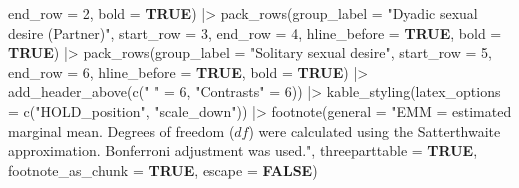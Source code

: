 \documentclass[
  bookmarksnumbered]{article}
\newenvironment{Shaded}{\begin{snugshade}}{\end{snugshade}}
\newcommand{\AttributeTok}[1]{\textcolor[rgb]{0.80,0.80,0.80}{#1}}
\newcommand{\ConstantTok}[1]{\textcolor[rgb]{0.86,0.64,0.64}{\textbf{#1}}}
\newcommand{\DecValTok}[1]{\textcolor[rgb]{0.86,0.86,0.80}{#1}}
\newcommand{\FunctionTok}[1]{\textcolor[rgb]{0.94,0.94,0.56}{#1}}
\newcommand{\NormalTok}[1]{\textcolor[rgb]{0.80,0.80,0.80}{#1}}
\newcommand{\OtherTok}[1]{\textcolor[rgb]{0.94,0.94,0.56}{#1}}
\newcommand{\SpecialCharTok}[1]{\textcolor[rgb]{0.86,0.64,0.64}{#1}}
\newcommand{\StringTok}[1]{\textcolor[rgb]{0.80,0.58,0.58}{#1}}
\begin{document}
\begin{Shaded}
\begin{Highlighting}[]
            \AttributeTok{end\_row =} \DecValTok{2}\NormalTok{,}
            \AttributeTok{bold =} \ConstantTok{TRUE}\NormalTok{) }\SpecialCharTok{|\textgreater{}}
  \FunctionTok{pack\_rows}\NormalTok{(}\AttributeTok{group\_label =} \StringTok{"Dyadic sexual desire (Partner)"}\NormalTok{,}
            \AttributeTok{start\_row =} \DecValTok{3}\NormalTok{,}
            \AttributeTok{end\_row =} \DecValTok{4}\NormalTok{,}
            \AttributeTok{hline\_before =} \ConstantTok{TRUE}\NormalTok{,}
            \AttributeTok{bold =} \ConstantTok{TRUE}\NormalTok{) }\SpecialCharTok{|\textgreater{}}
  \FunctionTok{pack\_rows}\NormalTok{(}\AttributeTok{group\_label =} \StringTok{"Solitary sexual desire"}\NormalTok{,}
            \AttributeTok{start\_row =} \DecValTok{5}\NormalTok{,}
            \AttributeTok{end\_row =} \DecValTok{6}\NormalTok{,}
            \AttributeTok{hline\_before =} \ConstantTok{TRUE}\NormalTok{,}
            \AttributeTok{bold =} \ConstantTok{TRUE}\NormalTok{) }\SpecialCharTok{|\textgreater{}}
  \FunctionTok{add\_header\_above}\NormalTok{(}\FunctionTok{c}\NormalTok{(}\StringTok{" "} \OtherTok{=} \DecValTok{6}\NormalTok{, }\StringTok{"Contrasts"} \OtherTok{=} \DecValTok{6}\NormalTok{)) }\SpecialCharTok{|\textgreater{}} 
  \FunctionTok{kable\_styling}\NormalTok{(}\AttributeTok{latex\_options =} \FunctionTok{c}\NormalTok{(}\StringTok{"HOLD\_position"}\NormalTok{, }\StringTok{"scale\_down"}\NormalTok{)) }\SpecialCharTok{|\textgreater{}}
  \FunctionTok{footnote}\NormalTok{(}\AttributeTok{general =} \StringTok{"EMM = estimated marginal mean.}
\StringTok{           Degrees of freedom ($df$) were calculated }
\StringTok{           using the Satterthwaite approximation.}
\StringTok{           Bonferroni adjustment was used."}\NormalTok{,}
           \AttributeTok{threeparttable =} \ConstantTok{TRUE}\NormalTok{,}
           \AttributeTok{footnote\_as\_chunk =} \ConstantTok{TRUE}\NormalTok{,}
           \AttributeTok{escape =} \ConstantTok{FALSE}\NormalTok{)}
\end{Highlighting}
\end{Shaded}
\end{document}
